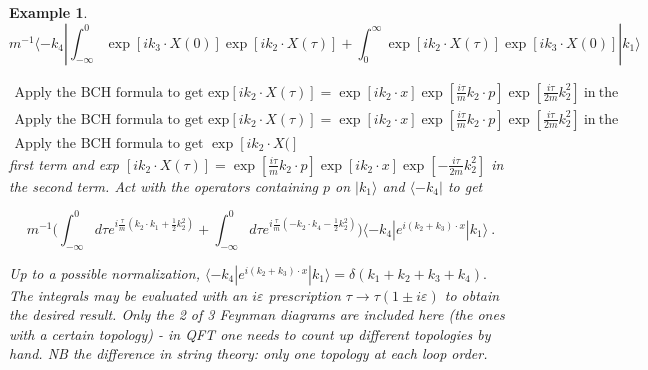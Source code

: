 \documentclass[10pt,
 article,
 amsmath,amssymb
]{revtex4-2}
\newtheorem{example}[theorem]{Example}
\begin{document}
\begin{example}
$$m^{-1}\langle-k_4|\int_{-\infty}^0\exp\left[ik_3\cdot X(0)\right]\exp\left[ik_2\cdot X(\tau)\right]+\int_0^\infty\exp\left[ik_2\cdot X(\tau)\right]\exp\left[ik_3\cdot X(0)\right]|k_1\rangle $$

$\begin{array}{c}\text{Apply the BCH formula to get exp}\left[ik_2\cdot X(\tau)\right]=\exp\left[ik_2\cdot x\right]\exp\left[\frac{i\tau}mk_2\cdot p\right]\exp\left[\frac{i\tau}{2m}k_2^2\right]\mathrm{~in~the}\\\text{Apply the BCH formula to get exp}\left[ik_2\cdot X(\tau)\right]=\exp\left[ik_2\cdot x\right]\exp\left[\frac{i\tau}mk_2\cdot p\right]\exp\left[\frac{i\tau}{2m}k_2^2\right]\mathrm{\:in~the}\\\text{Apply the BCH formula to get }\exp\left[ik_2\cdot X(\right]\end{array}$ first term and exp $[ik_2\cdot X(\tau)]=\exp\left[\frac{i\tau}mk_2\cdot p\right]\exp\left[ik_2\cdot x\right]\exp\left[-\frac{i\tau}{2m}k_2^2\right]$ in the second term. Act with the operators containing $p$ on $|k_1\rangle$ and $\langle-k_4|$ to get

$$m^{-1}\Big(\int_{-\infty}^0d\tau e^{i\frac\tau m(k_2\cdot k_1+\frac12k_2^2)}+\int_{-\infty}^0d\tau e^{i\frac\tau m(-k_2\cdot k_4-\frac12k_2^2)}\Big)\langle-k_4|e^{i(k_2+k_3)\cdot x}|k_1\rangle\:.$$

Up to a possible normalization, $\langle-k_4|e^{i(k_2+k_3)\cdot x}|k_1\rangle=\delta(k_1+k_2+k_3+k_4).$ The integrals
may be evaluated with an $i\varepsilon$ prescription $\tau\to\tau(1\pm i\varepsilon)$ to obtain the desired result.
Only the 2 of 3 Feynman diagrams are included here (the ones with a certain topology) - in QFT one needs to count up different topologies by hand. NB the difference in string theory: only one topology at each loop order.
\end{example}
\end{document}
